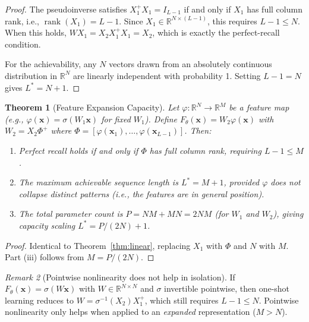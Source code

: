 \documentclass[11pt]{article}
\newtheorem{theorem}{Theorem}
\theoremstyle{definition}
\theoremstyle{remark}
\newtheorem{remark}[theorem]{Remark}
\begin{document}
\begin{proof}
The pseudoinverse satisfies $X_1^+ X_1 = I_{L-1}$ if and only if $X_1$ has full column rank, i.e., $\operatorname{rank}(X_1) = L - 1$. Since $X_1 \in \mathbb{R}^{N \times (L-1)}$, this requires $L - 1 \leq N$. When this holds, $WX_1 = X_2 X_1^+ X_1 = X_2$, which is exactly the perfect-recall condition.

For the achievability, any $N$ vectors drawn from an absolutely continuous distribution in $\mathbb{R}^N$ are linearly independent with probability 1. Setting $L - 1 = N$ gives $L^* = N + 1$.
\end{proof}

\begin{theorem}[Feature Expansion Capacity]\label{thm:feature}
Let $\varphi: \mathbb{R}^N \to \mathbb{R}^M$ be a feature map (e.g., $\varphi(\mathbf{x}) = \sigma(W_1 \mathbf{x})$ for fixed $W_1$). Define $F_\theta(\mathbf{x}) = W_2 \varphi(\mathbf{x})$ with $W_2 = X_2 \Phi^+$ where $\Phi = [\varphi(\mathbf{x}_1), \ldots, \varphi(\mathbf{x}_{L-1})]$. Then:
\begin{enumerate}
    \item[(i)] Perfect recall holds if and only if $\Phi$ has full column rank, requiring $L - 1 \leq M$.
    \item[(ii)] The maximum achievable sequence length is $L^* = M + 1$, provided $\varphi$ does not collapse distinct patterns (i.e., the features are in general position).
    \item[(iii)] The total parameter count is $P = NM + MN = 2NM$ (for $W_1$ and $W_2$), giving capacity scaling $L^* = P/(2N) + 1$.
\end{enumerate}
\end{theorem}

\begin{proof}
Identical to Theorem~\ref{thm:linear}, replacing $X_1$ with $\Phi$ and $N$ with $M$. Part (iii) follows from $M = P/(2N)$.
\end{proof}

\begin{remark}[Pointwise nonlinearity does not help in isolation]
If $F_\theta(\mathbf{x}) = \sigma(W\mathbf{x})$ with $W \in \mathbb{R}^{N \times N}$ and $\sigma$ invertible pointwise, then one-shot learning reduces to $W = \sigma^{-1}(X_2) X_1^+$, which still requires $L - 1 \leq N$. Pointwise nonlinearity only helps when applied to an \emph{expanded} representation ($M > N$).
\end{remark}
\end{document}
